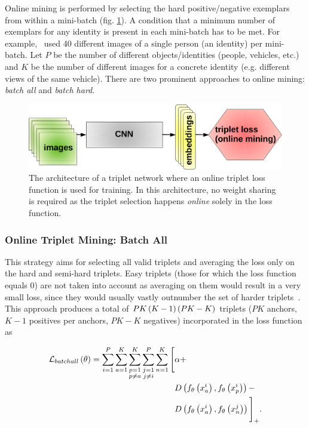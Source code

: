 Online mining is performed by selecting the hard positive/negative exemplars from within a mini-batch (fig. \ref{fig:TripletArchitectureOnlineMining}). A condition that a minimum number of exemplars for any identity is present in each mini-batch has to be met. For example,~\cite{Schroff2015} used 40 different images of a single person (an identity) per mini-batch. Let $P$ be the number of different objects/identities (people, vehicles, etc.) and $K$ be the number of different images for a concrete identity (e.g. different views of the same vehicle). There are two prominent approaches to online mining: \emph{batch all} and \emph{batch hard}.

\begin{figure}[t]
    \centerline{\includegraphics[width=0.55\linewidth]{figures/theoretical_foundations/triplet_architecture_online_mining.pdf}}
    \caption[Triplet loss online mining architecture]{The architecture of a triplet network where an online triplet loss function is used for training. In this architecture, no weight sharing is required as the triplet selection happens \emph{online} solely in the loss function.}
    \label{fig:TripletArchitectureOnlineMining}
\end{figure}

\subsubsection{Online Triplet Mining: Batch All}

This strategy aims for selecting all valid triplets and averaging the loss only on the hard and semi-hard triplets. Easy triplets (those for which the loss function equals $0$) are not taken into account as averaging on them would result in a very small loss, since they would usually vastly outnumber the set of harder triplets~\cite{Hermans2017}. This approach produces a total of $PK \left( {K - 1} \right) \left( {PK - K} \right)$ triplets ($PK$ anchors, $K - 1$ positives per anchors, $PK - K$ negatives) incorporated in the loss function as

\begin{equation}
    \label{eq:BatchAllLossFunction}
    \begin{aligned}
        {\mathcal{L}_{batchall}} \left( \theta \right) =
        \sum_{i = 1}^P
        \sum_{a = 1}^K
        \sum_{\substack{p = 1\\p \neq a}}^K
        \sum_{\substack{j = 1\\j \neq i}}^P
        \sum_{n = 1}^K
        \Bigg[
        &\alpha +\\
        &{D} \left( 
            {f_\theta} \left( x_a^i \right),
            {f_\theta} \left( x_p^i \right)
         \right) -\\
        &{D} \left( 
            {f_\theta} \left( x_a^i \right),
            {f_\theta} \left( x_n^j \right)
         \right)
        {\Bigg]}_{+}.
    \end{aligned}
\end{equation}

